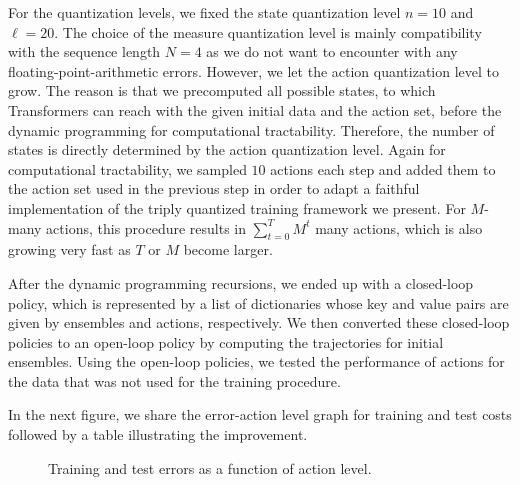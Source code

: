 \documentclass[11pt]{article}
\begin{document}
For the quantization levels, we fixed the state quantization level $n = 10$ and $\ell = 20$. The choice of the measure quantization level is mainly compatibility with the sequence length $N=4$ as we do not want to encounter with any floating-point-arithmetic errors. However, we let the action quantization level to grow. The reason is that we precomputed all possible states, to which Transformers can reach with the given initial data and the action set, before the dynamic programming for computational tractability. Therefore, the number of states is directly determined by the action quantization level. Again for computational tractability, we sampled $10$ actions each step and added them to the action set used in the previous step in order to adapt a faithful implementation of the triply quantized training framework we present. For $M$-many actions, this procedure results in $\sum_{t=0}^T M^t$ many actions, which is also growing very fast as $T$ or $M$ become larger. 

After the dynamic programming recursions, we ended up with a closed-loop policy, which is represented by a list of dictionaries whose key and value pairs are given by ensembles and actions, respectively. We then converted these closed-loop policies to an open-loop policy by computing the trajectories for initial ensembles. Using the open-loop policies, we tested the performance of actions for the data that was not used for the training procedure. 

In the next figure, we share the error-action level graph for training and test costs followed by a table illustrating the improvement.
\begin{figure}[H]
\centering
{}
\caption{Training and test errors as a function of action level.}
\end{figure}
\end{document}
